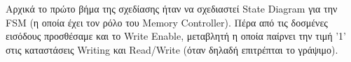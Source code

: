 \documentclass{article}
\begin{document}
\begin{justify}
\hspace{1.5em}
Αρχικά το πρώτο βήμα της σχεδίασης ήταν να σχεδιαστεί  State Diagram για την FSM (η οποία έχει τον ρόλο του Memory Controller).
Πέρα από τις δοσμένες εισόδους προσθέσαμε και το Write Enable, μεταβλητή η οποία παίρνει την τιμή '1' στις καταστάσεις Writing και Read/Write (όταν δηλαδή επιτρέπται το γράψιμο).

\end{justify}

\vspace{0.5cm}

\end{document}
